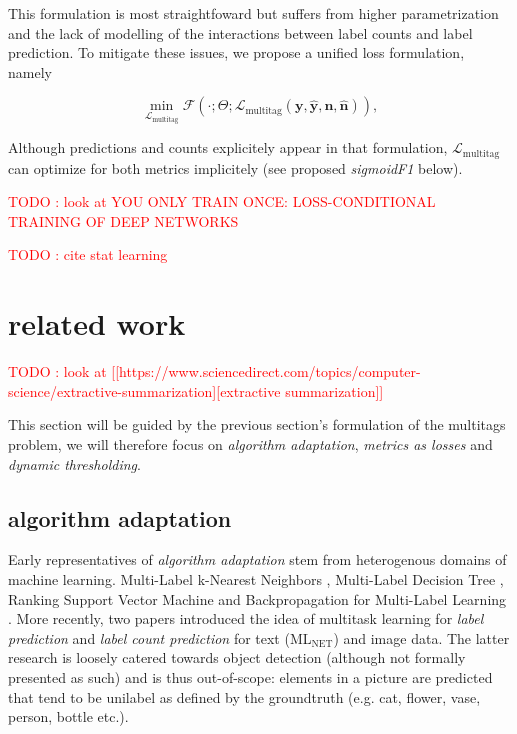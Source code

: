 \documentclass[sigconf,natbib,screen=true,review=true,anonymous]{acmart}
\newcommand\todo[1]{\textcolor{red}{TODO : #1}}
\begin{document}
This formulation is most straightfoward but suffers from higher parametrization and the lack of modelling of the interactions between label counts and label prediction. To mitigate these issues, we propose a unified loss formulation, namely

\begin{equation}
\underset{\mathcal{L}_{\text {multitag}}} {\min} \mathcal{F}\left(\cdot ; \Theta; \mathcal{L}_{\text {multitag}} (\mathbf{y}, \hat{\mathbf{y}}, \mathbf{n}, \hat{\mathbf{n}}) \right),
\end{equation}

Although predictions and counts explicitely appear in that formulation, \(\mathcal{L}_{\text {multitag}}\) can optimize for both metrics implicitely (see proposed \emph{sigmoidF1} below).


\todo{look at YOU ONLY TRAIN ONCE: LOSS-CONDITIONAL TRAINING OF DEEP NETWORKS}

\todo{cite stat learning}   \cite[p. 308-310]{statLearning}

\section{related work}
\label{sec:org5bfaf5e}

\todo{look at [[https://www.sciencedirect.com/topics/computer-science/extractive-summarization][extractive summarization]]}

This section will be guided by the previous section's formulation of the multitags problem, we will therefore focus on \emph{algorithm adaptation}, \emph{metrics as losses} and \emph{dynamic thresholding}.

\subsection{algorithm adaptation}
\label{sec:orge9c5683}

Early representatives of \emph{algorithm adaptation} stem from heterogenous domains of machine learning. Multi-Label k-Nearest Neighbors \cite{ML-KNN}, Multi-Label Decision Tree \cite{ML-DT}, Ranking Support Vector Machine \cite{multilabelSVM} and Backpropagation for Multi-Label Learning \cite{multilabelBackprop}. More recently, two papers introduced the idea of multitask learning for \emph{label prediction} and \emph{label count prediction} for text (ML\(_{\text{NET}}\)) \cite{multitaskLabel} and image \cite{multitaskLabelImages} data. The latter research is loosely catered towards object detection (although not formally presented as such) and is thus out-of-scope: elements in a picture are predicted that tend to be unilabel as defined by the groundtruth (e.g. cat, flower, vase, person, bottle etc.).
\end{document}
